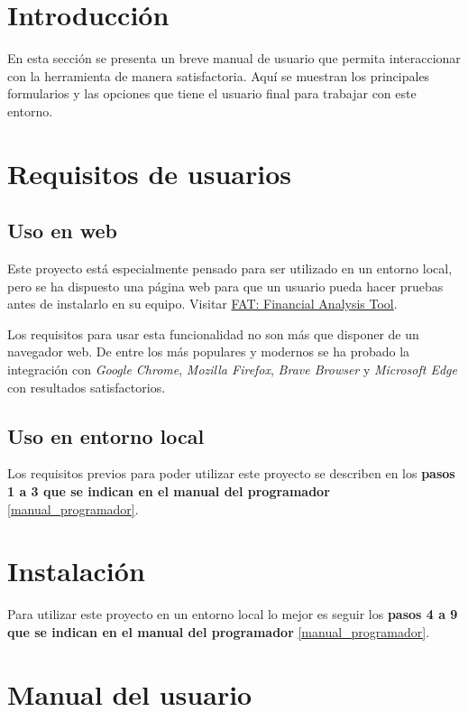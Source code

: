 
\section{Introducción}

En esta sección se presenta un breve manual de usuario que permita interaccionar con la herramienta de manera satisfactoria. Aquí se muestran los principales formularios y las opciones que tiene el usuario final para trabajar con este entorno. 

\section{Requisitos de usuarios}

\subsection{Uso en web}

Este proyecto está especialmente pensado para ser utilizado en un entorno local, pero se ha dispuesto una página web para que un usuario pueda hacer pruebas antes de instalarlo en su equipo. Visitar \href{http://takeiteasy.pythonanywhere.com/}{FAT: Financial Analysis Tool}.

Los requisitos para usar esta funcionalidad no son más que disponer de un navegador web. De entre los más populares y modernos se ha probado la integración con \emph{Google Chrome}, \emph{Mozilla Firefox}, \emph{Brave Browser} y \emph{Microsoft Edge} con resultados satisfactorios. 

\subsection{Uso en entorno local}

Los requisitos previos para poder utilizar este proyecto se describen en los \textbf{pasos 1 a 3 que se indican en el manual del programador} \ref{manual_programador}.


\section{Instalación}

Para utilizar este proyecto en un entorno local lo mejor es seguir los \textbf{pasos 4 a 9 que se indican en el manual del programador} \ref{manual_programador}. 

\section{Manual del usuario}

